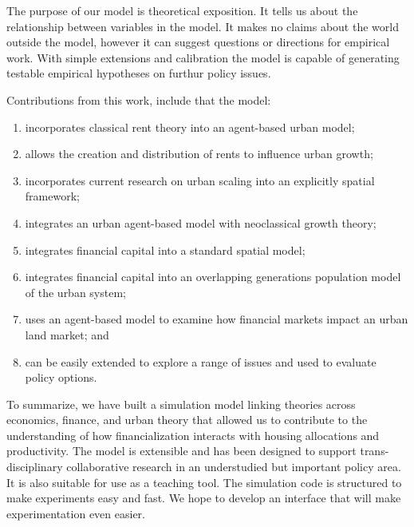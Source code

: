 The purpose of our model is \gls{theoretical exposition}. It tells us about the relationship between variables in the model.  It makes no claims about the world outside the model, however it can suggest questions or directions for empirical work. With simple extensions and calibration the model is capable of generating testable empirical hypotheses on furthur policy issues.  %

Contributions from this work, include that the model: 
\begin{enumerate}
    \item  incorporates \gls{classical rent theory} into an \gls{agent-based} urban model; 
    
    \item allows the creation and distribution of rents to influence urban growth; 
    
    \item incorporates current research on \gls{urban scaling} into an explicitly spatial framework;
    
    \item integrates an urban \gls{agent-based model} with {neoclassical growth theory}; 
    
    \item integrates \gls{financial capital} into a standard spatial model;
    
    \item integrates financial capital into an \gls{overlapping generations} population model of the urban system;
    
    \item uses an agent-based model to examine how financial markets impact an urban \gls{land market}; and 

    \item can be easily extended to explore a range of issues and used to evaluate policy options. 
\end{enumerate}
To summarize, we have built a simulation model linking theories across economics, finance, and urban theory that allowed us to contribute to the understanding of how financialization interacts with housing allocations and productivity. The model is extensible and has been designed to support trans-disciplinary collaborative research in an understudied but important policy area. It is also suitable for use as a teaching tool. The simulation code is structured to make experiments easy and fast. We hope to develop an interface that will make experimentation even easier.

